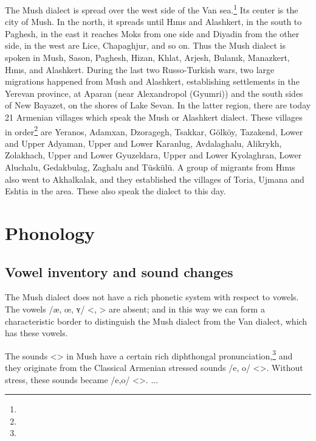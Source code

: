 The Mush dialect is spread over the west side of the Van sea.\footnote{}  Its center is the city of Mush. In the north, it spreads until Hınıs and Alashkert, in the south to Paghesh, in the east it reaches Moks from one side and Diyadin from the other side, in the west are Lice, Chapaghjur, and so on. Thus the Mush dialect is spoken in Mush, Sason, Paghesh, Hizan, Khlat, Arjesh, Bulanık, Manazkert, Hınıs, and Alashkert. During the last two Russo-Turkish wars, two large migrations happened from Mush and Alashkert, establishing settlements in the Yerevan province, at Aparan (near Alexandropol (Gyumri)) and the south sides of New Bayazet, on the shores of Lake Sevan. In the latter region, there are today 21 Armenian villages which speak the Mush or Alashkert dialect. These villages in order\footnote{} are Yeranos, Adamxan, Dzoragegh, Tsakkar, Gölköy, Tazakend, Lower and Upper Adyaman, Upper and Lower Karanlug, Avdalaghalu, Alikrykh, Zolakhach, Upper and Lower Gyuzeldara, Upper and Lower Kyolaghran, Lower Aluchalu, Gedakbulag, Zaghalu and Tüskülü. A group of migrants from Hınıs also went to Akhalkalak, and they established the villages of Toria, Ujmana and Eshtia in the area. These also speak the dialect to this day.



\section{Phonology}
\subsection{Vowel inventory and sound changes}

The Mush dialect does not have a rich phonetic system with respect to vowels. The vowels /æ, œ, ʏ/ <, > are absent; and in this way we can form a characteristic border to distinguish the Mush dialect from the Van dialect, which has these vowels. 

The sounds <> in Mush have a certain rich diphthongal pronunciation,\footnote{} and they originate from the Classical Armenian stressed sounds /e, o/ <>. Without stress, these sounds became /e,o/ <>. ... 


